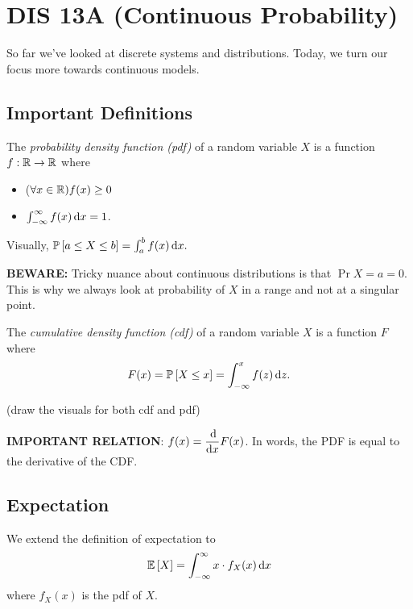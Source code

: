 \section{DIS 13A (Continuous Probability)}

So far we've looked at discrete systems and distributions. Today, we turn our focus more towards continuous models. 

\subsection{Important Definitions}

\begin{definition}
    The \textit{probability density function (pdf)} of a random variable $X$ is a function $f: \operatorname{\mathbb{R}} \to \operatorname{\mathbb{R}}$ where \begin{itemize}
        \item ($\forall x \in \operatorname{\mathbb{R}}) f(x) \ge 0$
        \item $\int_{-\infty}^{\infty} f(x) \operatorname{d\!} x = 1$.
    \end{itemize}
\end{definition}

Visually, $\mathbb{P}\left[ a \le X \le b \right] = \int_{a}^{b} f(x) \operatorname{d\!} x.$

\textbf{BEWARE:} Tricky nuance about continuous distributions is that $\Pr{X = a} = 0$. This is why we always look at probability of $X$ in a range and not at a singular point. 

\begin{definition}
    The \textit{cumulative density function (cdf)} of a random variable $X$ is a function $F$ where \[ F(x) = \mathbb{P}\left[ X \le x \right] = \int_{-\infty}^{x} f(z) \operatorname{d\!} z. \]
\end{definition}

(draw the visuals for both cdf and pdf)

\textbf{IMPORTANT RELATION}: $\displaystyle f(x) = \frac{\operatorname{d\!}}{\operatorname{d\!} x} F(x)$. In words, the PDF is equal to the derivative of the CDF. 

\subsection{Expectation}
We extend the definition of expectation to \[ \mathbb{E}\left[ X \right] = \int_{-\infty}^{\infty} x \cdot f_{X}(x) \operatorname{d\!} x \] where $f_X(x)$ is the pdf of $X$. 


